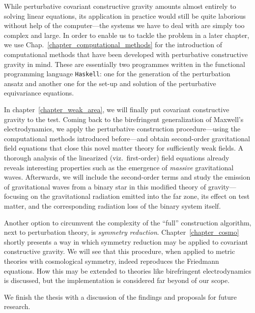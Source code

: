 While perturbative covariant constructive gravity amounts almost entirely to solving linear equations, its application in practice would still be quite laborious without help of the computer---the systems we have to deal with are simply too complex and large. In order to enable us to tackle the problem in a later chapter, we use Chap.~\ref{chapter_computational_methods} for the introduction of computational methods that have been developed with perturbative constructive gravity in mind. These are essentially two programmes written in the functional programming language \texttt{Haskell}: one for the generation of the perturbation ansatz and another one for the set-up and solution of the perturbative equivariance equations.

In chapter~\ref{chapter_weak_area}, we will finally put covariant constructive gravity to the test. Coming back to the birefringent generalization of Maxwell's electrodynamics, we apply the perturbative construction procedure---using the computational methods introduced before---and obtain second-order gravitational field equations that close this novel matter theory for sufficiently weak fields. A thorough analysis of the linearized (viz.\ first-order) field equations already reveals interesting properties such as the emergence of \emph{massive} gravitational waves. Afterwards, we will include the second-order terms and study the emission of gravitational waves from a binary star in this modified theory of gravity---focusing on the gravitational radiation emitted into the far zone, its effect on test matter, and the corresponding radiation loss of the binary system itself.

Another option to circumvent the complexity of the ``full'' construction algorithm, next to perturbation theory, is \emph{symmetry reduction}. Chapter~\ref{chapter_cosmo} shortly presents a way in which symmetry reduction may be applied to covariant constructive gravity. We will see that this procedure, when applied to metric theories with cosmological symmetry, indeed reproduces the Friedmann equations. How this may be extended to theories like birefringent electrodynamics is discussed, but the implementation is considered far beyond of our scope.

We finish the thesis with a discussion of the findings and proposals for future research.

